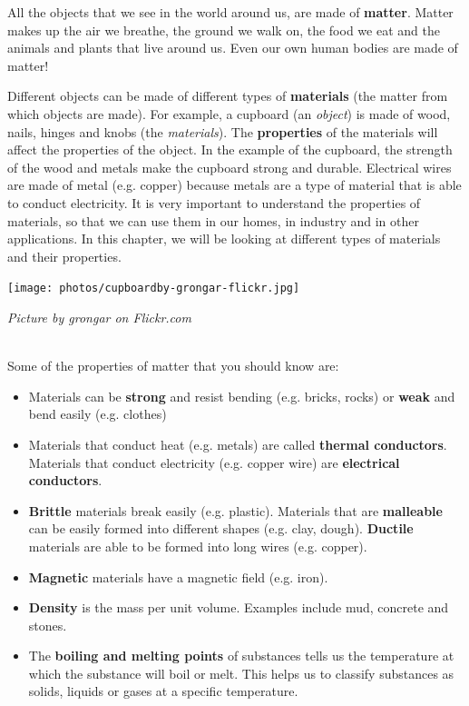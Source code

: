             \label{m38708*id62175}All the objects that we see in the world around us, are made of \textbf{matter}. Matter makes up the air we breathe, the ground we walk on, the food we eat and the animals and plants that live around us. Even our own human bodies are made of matter!\par 
\begin{minipage}{.5\textwidth}
      \label{m38708*id62185}Different objects can be made of different types of \textbf{materials} (the matter from which objects are made). For example, a cupboard (an \textsl{object}) is made of wood, nails, hinges and knobs (the \textsl{materials}). The \textbf{properties} of the materials will affect the properties of the object. In the example of the cupboard, the strength of the wood and metals make the cupboard strong and durable. Electrical wires are made of metal (e.g. copper) because metals are a type of material that is able to conduct electricity. It is very important to understand the properties of materials, so that we can use them in our homes, in industry and in other applications. In this chapter, we will be looking at different types of materials and their properties.\par 
\end{minipage}
\begin{minipage}{.5\textwidth}
\begin{center}
 \texttt{[image: photos/cupboardby-grongar-flickr.jpg]}\par
\textit{Picture by grongar on Flickr.com}
\end{center}
\end{minipage} \\
\label{m38708*id0132}Some of the properties of matter that you should know are:
\label{m38708*lid825}\begin{itemize}[noitemsep]
  \item Materials can be \textbf{strong} and resist bending (e.g. bricks, rocks) or \textbf{weak} and bend easily (e.g. clothes)
  \item Materials that conduct heat (e.g. metals) are called \textbf{thermal conductors}. Materials that conduct electricity (e.g. copper wire) are \textbf{electrical conductors}.
  \item \textbf{Brittle} materials break easily (e.g. plastic). Materials that are \textbf{malleable} can be easily formed into different shapes (e.g. clay, dough). \textbf{Ductile} materials are able to be formed into long wires (e.g. copper).
  \item \textbf{Magnetic} materials have a magnetic field (e.g. iron).
  \item \textbf{Density} is the mass per unit volume. Examples include mud, concrete and stones.
  \item The \textbf{boiling and melting points} of substances tells us the temperature at which the substance will boil or melt. This helps us to classify substances as solids, liquids or gases at a specific temperature.\end{itemize}
